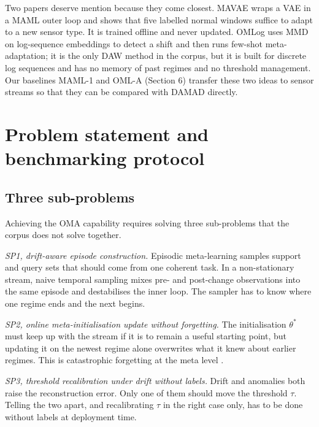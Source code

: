 Two papers deserve mention because they come closest. MAVAE \citep{moon2023mavae} wraps a VAE in a MAML outer loop and shows that five labelled normal windows suffice to adapt to a new sensor type. It is trained offline and never updated. OMLog \citep{tian2024omlog} uses MMD on log-sequence embeddings to detect a shift and then runs few-shot meta-adaptation; it is the only DAW method in the corpus, but it is built for discrete log sequences and has no memory of past regimes and no threshold management. Our baselines MAML-1 and OML-A (Section 6) transfer these two ideas to sensor streams so that they can be compared with DAMAD directly.

\hypertarget{problem-statement-and-benchmarking-protocol}{%
\section{Problem statement and benchmarking protocol}\label{problem-statement-and-benchmarking-protocol}}

\hypertarget{three-sub-problems}{%
\subsection{Three sub-problems}\label{three-sub-problems}}

Achieving the OMA capability requires solving three sub-problems that the corpus does not solve together.

\emph{SP1, drift-aware episode construction.} Episodic meta-learning samples support and query sets that should come from one coherent task. In a non-stationary stream, naive temporal sampling mixes pre- and post-change observations into the same episode and destabilises the inner loop. The sampler has to know where one regime ends and the next begins.

\emph{SP2, online meta-initialisation update without forgetting.} The initialisation \(\theta^*\) must keep up with the stream if it is to remain a useful starting point, but updating it on the newest regime alone overwrites what it knew about earlier regimes. This is catastrophic forgetting at the meta level \citep{kirkpatrick2017ewc}.

\emph{SP3, threshold recalibration under drift without labels.} Drift and anomalies both raise the reconstruction error. Only one of them should move the threshold \(\tau\). Telling the two apart, and recalibrating \(\tau\) in the right case only, has to be done without labels at deployment time.

